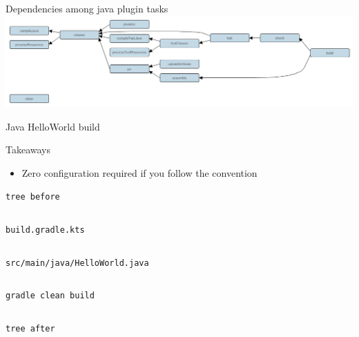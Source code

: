 \documentclass[presentation]{beamer}
\newcommand{\codefile}[4]{
	\begin{block}{\texttt{#2}}
		\inputminted[fontsize=#3,linenos=true,breaklines=true]{#4}{"workspace/#1/#2"}
	\end{block}
}
\newcommand{\java}[3]{\codefile{#1}{#2}{#3}{java}}
\newcommand{\kotlin}[3]{\codefile{#1}{#2}{#3}{kotlin}}
\newcommand{\terminal}[3]{\codefile{#1}{#2}{#3}{text}}
\begin{document}
\begin{frame}[fragile]{Dependencies among java plugin tasks}
    \includegraphics[width=\textwidth]{img/javaPluginTasks}
\end{frame}

\begin{frame}{Java HelloWorld build}
    \begin{block}{Takeaways}
        \begin{itemize}
            \item Zero configuration required if you follow the convention
        \end{itemize}
    \end{block}
    \terminal{13-Java}{tree before}{\normalsize}
    \kotlin{13-Java}{build.gradle.kts}{\normalsize}
    \java{13-Java}{src/main/java/HelloWorld.java}{\normalsize}
    \terminal{13-Java}{gradle clean build}{\scriptsize}
    \terminal{13-Java}{tree after}{\scriptsize}
\end{frame}
\end{document}
